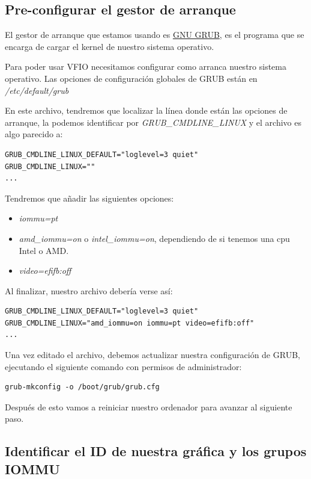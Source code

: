 \documentclass[12pt]{article}
\begin{document}
\subsection{Pre-configurar el gestor de arranque}

El gestor de arranque que estamos usando es \href{https://es.wikipedia.org/wiki/GNU_GRUB}{GNU GRUB}, es el programa que se encarga de cargar el kernel de nuestro sistema operativo.

Para poder usar VFIO necesitamos configurar como arranca nuestro sistema operativo. Las opciones de configuración globales de GRUB están en \emph{/etc/default/grub}

En este archivo, tendremos que localizar la línea donde están las opciones de arranque, la podemos identificar por \emph{GRUB\_CMDLINE\_LINUX} y el archivo es algo parecido a:

\begin{verbatim}
GRUB_CMDLINE_LINUX_DEFAULT="loglevel=3 quiet"
GRUB_CMDLINE_LINUX=""
...
\end{verbatim}

Tendremos que añadir las siguientes opciones:

\begin{itemize}
\setlength\itemsep{-0.2em}
\item \emph{iommu=pt}
\item \emph{amd\_iommu=on} o \emph{intel\_iommu=on}, dependiendo de si tenemos una cpu Intel o AMD.
\item \emph{video=efifb:off}
\end{itemize}

Al finalizar, nuestro archivo debería verse así:

\begin{verbatim}
GRUB_CMDLINE_LINUX_DEFAULT="loglevel=3 quiet"
GRUB_CMDLINE_LINUX="amd_iommu=on iommu=pt video=efifb:off"
...
\end{verbatim}

Una vez editado el archivo, debemos actualizar nuestra configuración de GRUB, ejecutando el siguiente comando con permisos de administrador:

\begin{verbatim}
grub-mkconfig -o /boot/grub/grub.cfg
\end{verbatim}

Después de esto vamos a reiniciar nuestro ordenador para avanzar al siguiente paso.

\subsection{Identificar el ID de nuestra gráfica y los grupos IOMMU}
\end{document}

